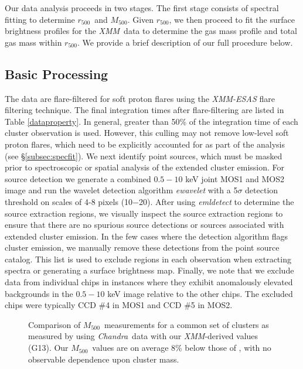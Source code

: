 \documentclass[preprint]{emulateapj}
\newcommand\rfive{$r_{500}$}
\newcommand\mfive{${M}_{500}$}
\newcommand{\xmm}{\textit{XMM}}
\newcommand{\chandra}{\textit{Chandra}}
\begin{document}
Our data analysis proceeds in two stages. The first stage consists of
spectral fitting to determine \rfive\ and \mfive. Given \rfive, we
then proceed to fit the surface brightness profiles for the \xmm\ data
to determine the gas mass profile and total gas mass within \rfive. We
provide a brief description of our full procedure below.

\subsection{Basic Processing}

The data are flare-filtered for soft proton flares using the
\emph{XMM-ESAS} flare filtering technique. The final integration times
after flare-filtering are listed in Table \ref{dataproperty}. In
general, greater than 50\% of the integration time of each cluster
observation is used. However, this culling may not remove low-level
soft proton flares, which need to be explicitly accounted for as part
of the analysis (see \S \ref{subsec:specfit}).  We next identify point
sources, which must be masked prior to spectroscopic or spatial
analysis of the extended cluster emission.  For source detection we
generate a combined $0.5-10$ keV joint MOS1 and MOS2 image and run the
wavelet detection algorithm \emph{ewavelet} with a 5$\sigma$ detection
threshold on scales of 4-8 pixels (10\arcsec$-$20\arcsec).  After
using \emph{emldetect} to determine the source extraction regions, we
visually inspect the source extraction regions to ensure that there
are no spurious source detections or sources associated with extended
cluster emission. In the few cases where the detection algorithm flags
cluster emission, we manually remove these detections from the point
source catalog.  This list is used to exclude regions in each
observation when extracting spectra or generating a surface brightness
map.  Finally, we note that we exclude data from individual chips in
instances where they exhibit anomalously elevated backgrounds in the
$0.5-10$ keV image relative to the other chips. The excluded chips
were typically CCD \#4 in MOS1 and CCD \#5 in MOS2.


\begin{figure}
\caption{
Comparison of \mfive\ measurements for a common set of clusters as measured by 
\citet[][V06]{vikhlinin2006} using \chandra\ data with our \xmm -derived values (G13).
Our \mfive\ values 
are on average 8\% below those of \citet[][dotted line]{vikhlinin2006},
with no observable dependence upon cluster mass.
 \label{fig:clustercomp}}
\end{figure}
\end{document}
